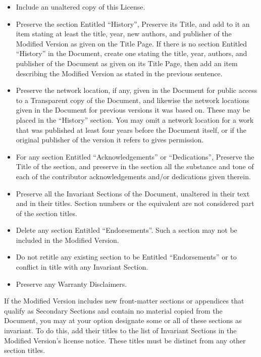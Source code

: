 \begin{enumerate}
\begin{itemize}
\item[H.]
   Include an unaltered copy of this License.
   
\item[I.]
   Preserve the section Entitled ``History'', Preserve its Title, and add
   to it an item stating at least the title, year, new authors, and
   publisher of the Modified Version as given on the Title Page.  If
   there is no section Entitled ``History'' in the Document, create one
   stating the title, year, authors, and publisher of the Document as
   given on its Title Page, then add an item describing the Modified
   Version as stated in the previous sentence.
   
\item[J.]
   Preserve the network location, if any, given in the Document for
   public access to a Transparent copy of the Document, and likewise
   the network locations given in the Document for previous versions
   it was based on.  These may be placed in the ``History'' section.
   You may omit a network location for a work that was published at
   least four years before the Document itself, or if the original
   publisher of the version it refers to gives permission.
   
\item[K.]
   For any section Entitled ``Acknowledgements'' or ``Dedications'',
   Preserve the Title of the section, and preserve in the section all
   the substance and tone of each of the contributor acknowledgements
   and/or dedications given therein.
   
\item[L.]
   Preserve all the Invariant Sections of the Document,
   unaltered in their text and in their titles.  Section numbers
   or the equivalent are not considered part of the section titles.
   
\item[M.]
   Delete any section Entitled ``Endorsements''.  Such a section
   may not be included in the Modified Version.
   
\item[N.]
   Do not retitle any existing section to be Entitled ``Endorsements''
   or to conflict in title with any Invariant Section.
   
\item[O.]
   Preserve any Warranty Disclaimers.
\end{itemize}

If the Modified Version includes new front-matter sections or
appendices that qualify as Secondary Sections and contain no material
copied from the Document, you may at your option designate some or all
of these sections as invariant.  To do this, add their titles to the
list of Invariant Sections in the Modified Version's license notice.
These titles must be distinct from any other section titles.


\end{enumerate}
